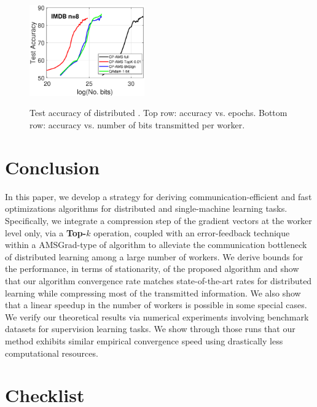 \documentclass[11pt]{article}
\begin{document}
\begin{figure}[H]
\begin{center}
{        \hspace{-0.1in}
        \includegraphics[width=1.95in]{fig/imbd_lstm_test_accuracy_8_vs_bits_Qadamsign.eps}
    }
    \end{center}
	\caption{Test accuracy of distributed \algo. Top row: accuracy vs. epochs. Bottom row: accuracy vs. number of bits transmitted per worker.}
	\label{fig:test accuracy dist}
\end{figure}


\section{Conclusion}\label{sec:conclusion}


In this paper, we develop a strategy for deriving communication-efficient and fast optimizations algorithms for distributed and single-machine learning tasks. 
Specifically, we integrate a compression step of the gradient vectors at the worker level only, via a \textbf{Top-$k$} operation, coupled with an error-feedback technique within a AMSGrad-type of algorithm to alleviate the communication bottleneck of distributed learning among a large number of workers.
We derive bounds for the performance, in terms of stationarity, of the proposed algorithm and show that our algorithm convergence rate matches state-of-the-art rates for distributed learning while compressing most of the transmitted information. 
We also show that a linear speedup in the number of workers is possible in some special cases.
We verify our theoretical results via numerical experiments involving benchmark datasets for supervision learning tasks.
We show through those runs that our method exhibits similar empirical convergence speed using drastically less computational resources.


\newpage




\clearpage 

\section*{Checklist}
\end{document}
